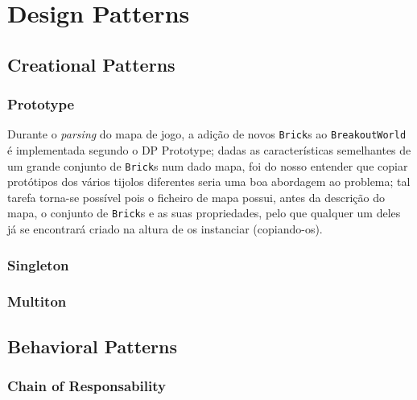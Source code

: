 \documentclass[a4paper]{article}
\begin{document}
\clearpage

\section{Design Patterns}
\subsection{Creational Patterns}
\subsubsection{Prototype}
\noindent Durante o \textit{parsing} do mapa de jogo, a adição de novos \texttt{Brick}s ao \texttt{BreakoutWorld} é implementada segundo o DP Prototype; dadas as características semelhantes de um grande conjunto de \texttt{Brick}s num dado mapa, foi do nosso entender que copiar protótipos dos vários tijolos diferentes seria uma boa abordagem ao problema; tal tarefa torna-se possível pois o ficheiro de mapa possui, antes da descrição do mapa, o conjunto de \texttt{Brick}s e as suas propriedades, pelo que qualquer um deles já se encontrará criado na altura de os instanciar (copiando-os).

\subsubsection{Singleton}

\subsubsection{Multiton}


\subsection{Behavioral Patterns}
\subsubsection{Chain of Responsability}
\end{document}
